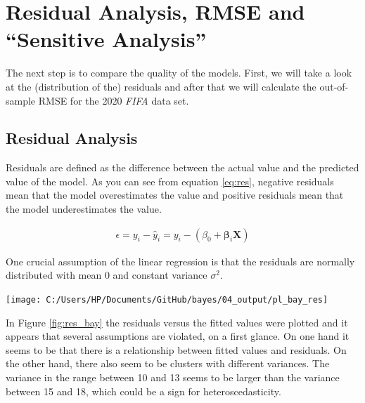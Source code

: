 \documentclass[12pt,a4paper]{article}
\let\origfigure\figure
\let\endorigfigure\endfigure
\renewenvironment{figure}[1][2] {
    \expandafter\origfigure\expandafter[H]
} {
    \endorigfigure
}
\begin{document}
\newpage

\hypertarget{residual-analysis-and-sensitive-analysis}{%
\section{\texorpdfstring{Residual Analysis, \acf{RMSE} and
\enquote{Sensitive
Analysis}}{Residual Analysis,  and `Sensitive Analysis'}}\label{residual-analysis-and-sensitive-analysis}}

The next step is to compare the quality of the models. First, we will
take a look at the (distribution of the) residuals and after that we
will calculate the out-of-sample \ac{RMSE} for the 2020 \emph{FIFA} data
set.

\hypertarget{residual-analysis}{%
\subsection{Residual Analysis}\label{residual-analysis}}

Residuals are defined as the difference between the actual value and the
predicted value of the model. As you can see from equation
\eqref{eq:res}, negative residuals mean that the model overestimates the
value and positive residuals mean that the model underestimates the
value. \autocite[p.~16]{hayashi_econometrics_2000}

\begin{align} 
\label{eq:res}
  \epsilon =  y_i - \hat{y}_i =  y_i - (  \beta_0  + \pmb{\beta}_i \pmb{X})
\end{align}

One crucial assumption of the linear regression is that the residuals
are normally distributed with mean \(0\) and constant variance
\(\sigma^2\).

\begin{figure}

\texttt{[image: C:/Users/HP/Documents/GitHub/bayes/04\_output/pl\_bay\_res]} \hfill{}

\caption{ \label{fig:res_bay} Plot of the Residuals vs Fitted Values for the Bayesian LASSO}\label{fig:fig2}
\end{figure}

In Figure \ref{fig:res_bay} the residuals versus the fitted values were
plotted and it appears that several assumptions are violated, on a first
glance. On one hand it seems to be that there is a relationship between
fitted values and residuals. On the other hand, there also seem to be
clusters with different variances. The variance in the range between 10
and 13 seems to be larger than the variance between 15 and 18, which
could be a sign for heteroscedasticity.
\end{document}
